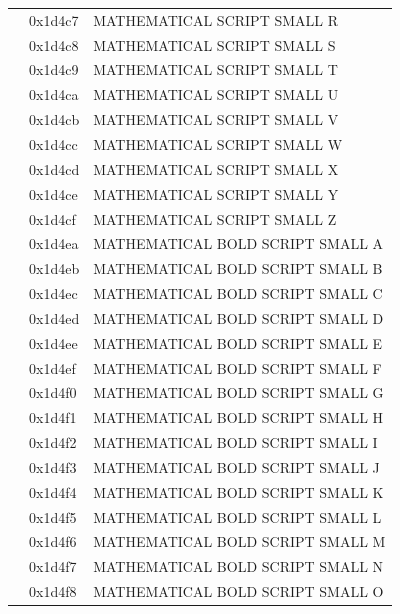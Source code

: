 \documentclass[12pt, twoside]{article}
\begin{document}
\begin{longtable}{L{1.0cm} L{2.0cm} >{\footnotesize}L{10cm}}
&0x1d4c7&MATHEMATICAL SCRIPT SMALL R\\
&0x1d4c8&MATHEMATICAL SCRIPT SMALL S\\
&0x1d4c9&MATHEMATICAL SCRIPT SMALL T\\
&0x1d4ca&MATHEMATICAL SCRIPT SMALL U\\
&0x1d4cb&MATHEMATICAL SCRIPT SMALL V\\
&0x1d4cc&MATHEMATICAL SCRIPT SMALL W\\
&0x1d4cd&MATHEMATICAL SCRIPT SMALL X\\
&0x1d4ce&MATHEMATICAL SCRIPT SMALL Y\\
&0x1d4cf&MATHEMATICAL SCRIPT SMALL Z\\
&0x1d4ea&MATHEMATICAL BOLD SCRIPT SMALL A\\
&0x1d4eb&MATHEMATICAL BOLD SCRIPT SMALL B\\
&0x1d4ec&MATHEMATICAL BOLD SCRIPT SMALL C\\
&0x1d4ed&MATHEMATICAL BOLD SCRIPT SMALL D\\
&0x1d4ee&MATHEMATICAL BOLD SCRIPT SMALL E\\
&0x1d4ef&MATHEMATICAL BOLD SCRIPT SMALL F\\
&0x1d4f0&MATHEMATICAL BOLD SCRIPT SMALL G\\
&0x1d4f1&MATHEMATICAL BOLD SCRIPT SMALL H\\
&0x1d4f2&MATHEMATICAL BOLD SCRIPT SMALL I\\
&0x1d4f3&MATHEMATICAL BOLD SCRIPT SMALL J\\
&0x1d4f4&MATHEMATICAL BOLD SCRIPT SMALL K\\
&0x1d4f5&MATHEMATICAL BOLD SCRIPT SMALL L\\
&0x1d4f6&MATHEMATICAL BOLD SCRIPT SMALL M\\
&0x1d4f7&MATHEMATICAL BOLD SCRIPT SMALL N\\
&0x1d4f8&MATHEMATICAL BOLD SCRIPT SMALL O\\

\end{longtable}
\end{document}
